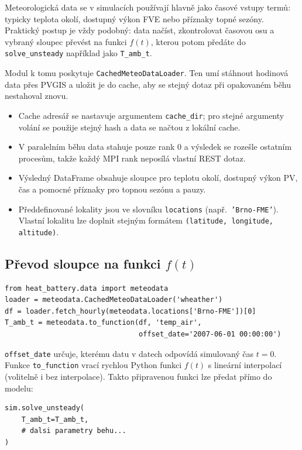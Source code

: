 \documentclass[a4paper,11pt]{article}
\begin{document}
Meteorologická data se v simulacích používají hlavně jako časové vstupy termů:
typicky teplota okolí, dostupný výkon FVE nebo příznaky topné sezóny. Praktický
postup je vždy podobný: data načíst, zkontrolovat časovou osu a vybraný sloupec
převést na funkci \(f(t)\), kterou potom předáte do \texttt{solve\_unsteady}
například jako \texttt{T\_amb\_t}.

Modul  k tomu poskytuje
\texttt{CachedMeteoDataLoader}. Ten umí stáhnout hodinová data přes PVGIS a
uložit je do cache, aby se stejný dotaz při opakovaném běhu nestahoval znovu.

\begin{itemize}
  \item Cache adresář se nastavuje argumentem \texttt{cache\_dir}; pro stejné
        argumenty volání se použije stejný hash a data se načtou z lokální cache.
  \item V paralelním běhu data stahuje pouze rank 0 a výsledek se rozešle
        ostatním procesům, takže každý MPI rank neposílá vlastní REST dotaz.
  \item Výsledný DataFrame obsahuje sloupce pro teplotu okolí, dostupný výkon
        PV, čas a pomocné příznaky pro topnou sezónu a pauzy.
  \item Předdefinované lokality jsou ve slovníku \texttt{locations}
        (např.\ \texttt{'Brno-FME'}). Vlastní lokalitu lze doplnit stejným
        formátem \texttt{(latitude, longitude, altitude)}.
\end{itemize}

\subsection*{Převod sloupce na funkci \(f(t)\)}

\begin{lstlisting}[style=py]
from heat_battery.data import meteodata
loader = meteodata.CachedMeteoDataLoader('wheather')
df = loader.fetch_hourly(meteodata.locations['Brno-FME'])[0]
T_amb_t = meteodata.to_function(df, 'temp_air',
                                offset_date='2007-06-01 00:00:00')
\end{lstlisting}

\texttt{offset\_date} určuje, kterému datu v datech odpovídá simulovaný čas
\(t=0\). Funkce \texttt{to\_function} vrací rychlou Python funkci \(f(t)\) s
lineární interpolací (volitelně i bez interpolace). Takto připravenou funkci lze
předat přímo do modelu:

\begin{lstlisting}[style=py]
sim.solve_unsteady(
    T_amb_t=T_amb_t,
    # dalsi parametry behu...
)
\end{lstlisting}
\end{document}

